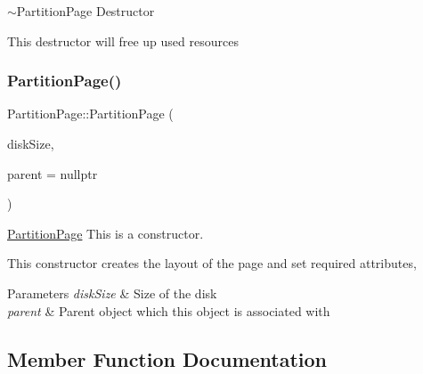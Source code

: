 $\sim$\+Partition\+Page Destructor 

This destructor will free up used resources \mbox{\label{classui_1_1wizard_1_1pages_1_1_partition_page_a426e777d0785c6992bcfa8a1badd242e}} 
\subsubsection{\texorpdfstring{Partition\+Page()}{PartitionPage()}\hspace{0.1cm}{\footnotesize\ttfamily [2/2]}}
{\footnotesize\ttfamily Partition\+Page\+::\+Partition\+Page (\begin{DoxyParamCaption}\item[{unsigned long long}]{disk\+Size,  }\item[{Q\+Widget $\ast$}]{parent = {\ttfamily nullptr} }\end{DoxyParamCaption})}



\mbox{\hyperlink{classui_1_1wizard_1_1pages_1_1_partition_page}{Partition\+Page}} This is a constructor. 

This constructor creates the layout of the page and set required attributes, 
\begin{DoxyParams}{Parameters}
{\em disk\+Size} & Size of the disk \\
\hline
{\em parent} & Parent object which this object is associated with \\
\hline
\end{DoxyParams}


\subsection{Member Function Documentation}
\mbox{\label{classui_1_1wizard_1_1pages_1_1_partition_page_a0160f5f4dd1dcc377dc7a2f1db732f24}} 
